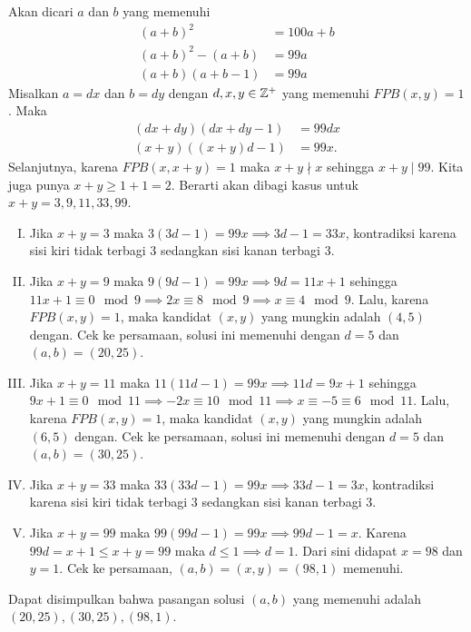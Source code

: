 

\begin{solusi}
    Akan dicari $a$ dan $b$ yang memenuhi
    \begin{align*}
        (a+b)^2&=100a+b\\
        (a+b)^2 - (a+b) &= 99a\\
        (a+b)(a+b-1) &= 99a
    \end{align*}
    Misalkan $a = dx$ dan $b = dy$ dengan $d,x,y \in \mathbb Z^+$  yang memenuhi $FPB(x,y) = 1$. Maka
    \begin{align*}
        (dx+dy)(dx+dy-1) &= 99dx\\
        (x+y)((x+y)d-1) &= 99x.
    \end{align*}
    Selanjutnya, karena $FPB(x,x+y)=1$ maka $x+y \nmid x$ sehingga $x+y \mid 99$. Kita juga punya $x+y \ge 1+1 = 2$. Berarti akan dibagi kasus untuk $x+y=3,9,11,33,99$.
    \begin{enumerate}[(I)]
        \item Jika $x+y = 3$ maka $3(3d-1) = 99x \implies 3d-1 = 33x$, kontradiksi karena sisi kiri tidak terbagi 3 sedangkan sisi kanan terbagi 3.

        \item Jika $x+y= 9$ maka $9(9d-1) = 99x \implies 9d = 11x+1$ sehingga $11x+1 \equiv 0 \mod 9 \implies 2x \equiv 8 \mod 9 \implies x \equiv 4 \mod 9$. Lalu, karena $FPB(x,y) = 1$, maka kandidat $(x,y)$ yang mungkin adalah $(4,5)$ dengan. Cek ke persamaan, solusi ini memenuhi dengan $d = 5$ dan $(a,b)=(20,25)$.

        \item Jika $x+y= 11$ maka $11(11d-1) = 99x \implies 11d = 9x+1$ sehingga $9x+1 \equiv 0 \mod 11 \implies -2x \equiv 10 \mod 11 \implies x \equiv -5 \equiv 6 \mod 11$. Lalu, karena $FPB(x,y) = 1$, maka kandidat $(x,y)$ yang mungkin adalah $(6,5)$ dengan. Cek ke persamaan, solusi ini memenuhi dengan $d = 5$ dan $(a,b)=(30,25)$.

        \item Jika $x+y = 33$ maka $33(33d-1) = 99x \implies 33d-1 = 3x$, kontradiksi karena sisi kiri tidak terbagi 3 sedangkan sisi kanan terbagi 3.

        \item Jika $x+y= 99$ maka $99(99d-1) = 99x \implies 99d-1 = x$. Karena $99d = x+1 \le x+y = 99$ maka $d \le 1 \implies d=1$. Dari sini didapat $x=98$ dan $y=1$. Cek ke persamaan, $(a,b)=(x,y)=(98,1)$ memenuhi.
    \end{enumerate}
    Dapat disimpulkan bahwa pasangan solusi $(a,b)$ yang memenuhi adalah $(20,25),(30,25),(98,1)$.
\end{solusi}